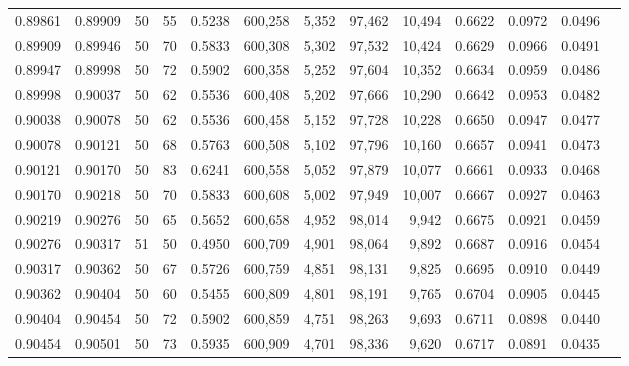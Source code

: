 \begin{tabular}{rrrrrrrrrrrrr}
0.89861 & 0.89909 &    50 &  55 &                                     0.5238 & 600,258 &   5,352 &  97,462 &  10,494 & 0.6622 & 0.0972 & 0.0496 \\
0.89909 & 0.89946 &    50 &  70 &                                     0.5833 & 600,308 &   5,302 &  97,532 &  10,424 & 0.6629 & 0.0966 & 0.0491 \\
0.89947 & 0.89998 &    50 &  72 &                                     0.5902 & 600,358 &   5,252 &  97,604 &  10,352 & 0.6634 & 0.0959 & 0.0486 \\
0.89998 & 0.90037 &    50 &  62 &                                     0.5536 & 600,408 &   5,202 &  97,666 &  10,290 & 0.6642 & 0.0953 & 0.0482 \\
0.90038 & 0.90078 &    50 &  62 &                                     0.5536 & 600,458 &   5,152 &  97,728 &  10,228 & 0.6650 & 0.0947 & 0.0477 \\
0.90078 & 0.90121 &    50 &  68 &                                     0.5763 & 600,508 &   5,102 &  97,796 &  10,160 & 0.6657 & 0.0941 & 0.0473 \\
0.90121 & 0.90170 &    50 &  83 &                                     0.6241 & 600,558 &   5,052 &  97,879 &  10,077 & 0.6661 & 0.0933 & 0.0468 \\
0.90170 & 0.90218 &    50 &  70 &                                     0.5833 & 600,608 &   5,002 &  97,949 &  10,007 & 0.6667 & 0.0927 & 0.0463 \\
0.90219 & 0.90276 &    50 &  65 &                                     0.5652 & 600,658 &   4,952 &  98,014 &   9,942 & 0.6675 & 0.0921 & 0.0459 \\
0.90276 & 0.90317 &    51 &  50 &                                     0.4950 & 600,709 &   4,901 &  98,064 &   9,892 & 0.6687 & 0.0916 & 0.0454 \\
0.90317 & 0.90362 &    50 &  67 &                                     0.5726 & 600,759 &   4,851 &  98,131 &   9,825 & 0.6695 & 0.0910 & 0.0449 \\
0.90362 & 0.90404 &    50 &  60 &                                     0.5455 & 600,809 &   4,801 &  98,191 &   9,765 & 0.6704 & 0.0905 & 0.0445 \\
0.90404 & 0.90454 &    50 &  72 &                                     0.5902 & 600,859 &   4,751 &  98,263 &   9,693 & 0.6711 & 0.0898 & 0.0440 \\
0.90454 & 0.90501 &    50 &  73 &                                     0.5935 & 600,909 &   4,701 &  98,336 &   9,620 & 0.6717 & 0.0891 & 0.0435 \\

\end{tabular}
